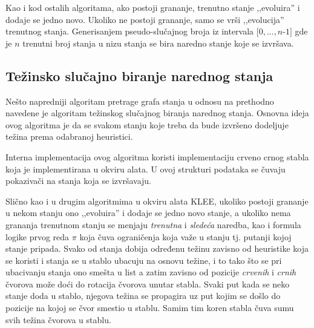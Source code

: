 \documentclass[12pt,oneside]{memoir}
\begin{document}
Kao i kod ostalih algoritama, ako postoji grananje, trenutno stanje ,,evoluira'' i dodaje se jedno novo. Ukoliko ne postoji grananje, samo se vrši ,,evolucija'' trenutnog stanja. Generisanjem pseudo-slučajnog broja iz intervala $[0, ..., n $-$ 1]$ gde je $n$ trenutni broj stanja u nizu stanja se bira naredno stanje koje se izvršava.

\subsection{Težinsko slučajno biranje narednog stanja} 
Nešto napredniji algoritam pretrage grafa stanja u odnosu na prethodno navedene je algoritam težinskog slučajnog biranja narednog stanja. Osnovna ideja ovog algoritma je da se svakom stanju koje treba da bude izvršeno dodeljuje težina prema odabranoj heuristici. 

Interna implementacija ovog algoritma koristi implementaciju crveno crnog stabla koja je implementirana u okviru alata. U ovoj strukturi podataka se čuvaju pokazivači na stanja koja se izvršavaju. 

Slično kao i u drugim algoritmima u okviru alata KLEE, ukoliko postoji grananje u nekom stanju ono ,,evoluira'' i dodaje se jedno novo stanje, a ukoliko nema grananja trenutnom stanju se menjaju \textit{trenutna} i \textit{sledeća} naredba, kao i formula logike prvog reda $\pi$ koja čuva ograničenja koja važe u stanju tj. putanji kojoj stanje pripada. Svako od stanja dobija određenu težinu zavisno od heuristike koja se koristi i stanja se u stablo ubacuju na osnovu težine, i to tako što se pri ubacivanju stanja ono smešta u list a zatim zavisno od pozicije \textit{crvenih} i \textit{crnih} čvorova može doći do rotacija čvorova unutar stabla. Svaki put kada se neko stanje doda u stablo, njegova težina se propagira uz put kojim se došlo do pozicije na kojoj se čvor smestio u stablu. Samim tim koren stabla čuva sumu svih težina čvorova u stablu. 
\end{document}
